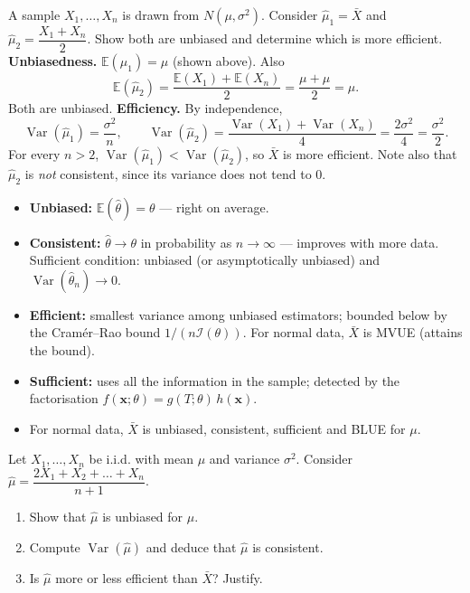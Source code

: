 \documentclass[11pt]{article}
\begin{document}
\begin{exoresolu}
A sample $X_1, \dots, X_n$ is drawn from $N(\mu, \sigma^2)$. Consider $\hat{\mu}_1 = \bar{X}$ and $\hat{\mu}_2 = \dfrac{X_1 + X_n}{2}$. Show both are unbiased and determine which is more efficient.
\tcblower
\textbf{Unbiasedness.} $\mathbb{E}(\hat{\mu}_1) = \mu$ (shown above). Also
\[ \mathbb{E}(\hat{\mu}_2) = \frac{\mathbb{E}(X_1) + \mathbb{E}(X_n)}{2} = \frac{\mu + \mu}{2} = \mu. \]
Both are unbiased. \textbf{Efficiency.} By independence,
\[ \operatorname{Var}(\hat{\mu}_1) = \frac{\sigma^2}{n}, \qquad \operatorname{Var}(\hat{\mu}_2) = \frac{\operatorname{Var}(X_1) + \operatorname{Var}(X_n)}{4} = \frac{2\sigma^2}{4} = \frac{\sigma^2}{2}. \]
For every $n > 2$, $\operatorname{Var}(\hat{\mu}_1) < \operatorname{Var}(\hat{\mu}_2)$, so $\bar{X}$ is more efficient. Note also that $\hat{\mu}_2$ is \emph{not} consistent, since its variance does not tend to $0$.
\end{exoresolu}

\begin{aretenir}
\begin{itemize}
\item \textbf{Unbiased:} $\mathbb{E}(\hat{\theta}) = \theta$ — right on average.
\item \textbf{Consistent:} $\hat{\theta} \to \theta$ in probability as $n \to \infty$ — improves with more data. Sufficient condition: unbiased (or asymptotically unbiased) and $\operatorname{Var}(\hat{\theta}_n) \to 0$.
\item \textbf{Efficient:} smallest variance among unbiased estimators; bounded below by the Cramér–Rao bound $1/(n\mathcal{I}(\theta))$. For normal data, $\bar{X}$ is MVUE (attains the bound).
\item \textbf{Sufficient:} uses all the information in the sample; detected by the factorisation $f(\mathbf{x};\theta) = g(T;\theta)\,h(\mathbf{x})$.
\item For normal data, $\bar{X}$ is unbiased, consistent, sufficient and BLUE for $\mu$.
\end{itemize}
\end{aretenir}

\begin{exercice}[Practice]
Let $X_1, \dots, X_n$ be i.i.d. with mean $\mu$ and variance $\sigma^2$. Consider $\hat{\mu} = \dfrac{2X_1 + X_2 + \dots + X_n}{n+1}$.
\begin{enumerate}
\item Show that $\hat{\mu}$ is unbiased for $\mu$.
\item Compute $\operatorname{Var}(\hat{\mu})$ and deduce that $\hat{\mu}$ is consistent.
\item Is $\hat{\mu}$ more or less efficient than $\bar{X}$? Justify.
\end{enumerate}
\end{exercice}
\end{document}
